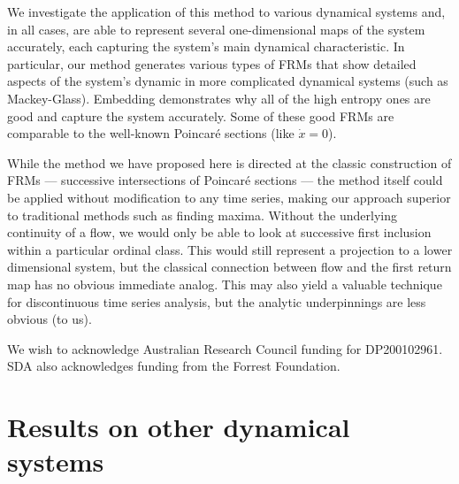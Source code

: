 \documentclass[%
 aip,
 amsmath,amssymb,
 reprint,%
]{revtex4-1}
\begin{document}
We investigate the application of this method to various dynamical systems and, in all cases, are able to represent several one-dimensional maps of the system accurately, each capturing the system's main dynamical characteristic.
In particular, our method generates various types of FRMs that show detailed aspects of the system's dynamic in more complicated dynamical systems (such as Mackey-Glass). Embedding demonstrates why all of the high entropy ones are good and capture the system accurately. Some of these good FRMs are comparable to the well-known Poincar\'e sections (like $\dot{x}=0$).

While the method we have proposed here is directed at the classic construction of FRMs --- successive intersections of Poincar\'e sections --- the method itself could be applied without modification to any time series, making our approach superior to traditional methods such as finding maxima. 
Without the underlying continuity of a flow, we would only be able to look at successive first inclusion within a particular ordinal class. This would still represent a projection to a lower dimensional system, but the classical connection between flow and the first return map has no obvious immediate analog. This may also yield a valuable technique for discontinuous time series analysis, but the analytic underpinnings are less obvious (to us).


\begin{acknowledgments}
We wish to acknowledge Australian Research Council funding for DP200102961. SDA also acknowledges funding from the Forrest Foundation.
\end{acknowledgments}


\appendix

\section{Results on other dynamical systems}
\end{document}
